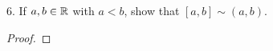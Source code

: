
6. If $a, b \in \mathbb{R}$ with $a < b$, show that $[a, b] \sim \left( a, b \right) $.

\begin{proof}
	
\end{proof}























